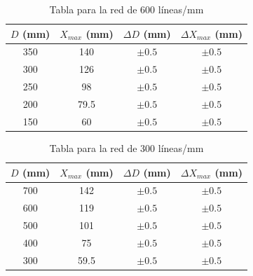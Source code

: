 \documentclass[11pt, a4paper, twocolumn]{article}
\begin{document}
\begin{table}[H]
    \caption{Tabla para la red de 600 líneas/mm }
    \centering
    \small
    \setlength{\tabcolsep}{4pt}
    \begin{tabular}{cccc}
        \hline
        $D$ (mm) &   $X_{max}$ (mm) & $\Delta D$ (mm)   & $\Delta X_{max}$ (mm)   \\
        \hline
            350 &            140   & $\pm 0.5$         & $\pm 0.5$               \\
            300 &            126   & $\pm 0.5$         & $\pm 0.5$               \\
            250 &             98   & $\pm 0.5$         & $\pm 0.5$               \\
            200 &             79.5 & $\pm 0.5$         & $\pm 0.5$               \\
            150 &             60   & $\pm 0.5$         & $\pm 0.5$               \\
        \hline
    \end{tabular}

       
\end{table}

\vspace{0.5cm}

\begin{table}[H]
    \caption{Tabla para la red de 300 líneas/mm}
    \centering
    \small
    \setlength{\tabcolsep}{4pt}
    \begin{tabular}{cccc}
        \hline
        $D$ (mm) &   $X_{max}$ (mm) & $\Delta D$ (mm)   & $\Delta X_{max}$ (mm)   \\
        \hline
            700 &            142   & $\pm 0.5$         & $\pm 0.5$               \\
            600 &            119   & $\pm 0.5$         & $\pm 0.5$               \\
            500 &            101   & $\pm 0.5$         & $\pm 0.5$               \\
            400 &             75   & $\pm 0.5$         & $\pm 0.5$               \\
            300 &             59.5 & $\pm 0.5$         & $\pm 0.5$               \\
        \hline
    \end{tabular}
\end{table}

\vspace{0.5cm}
\end{document}
